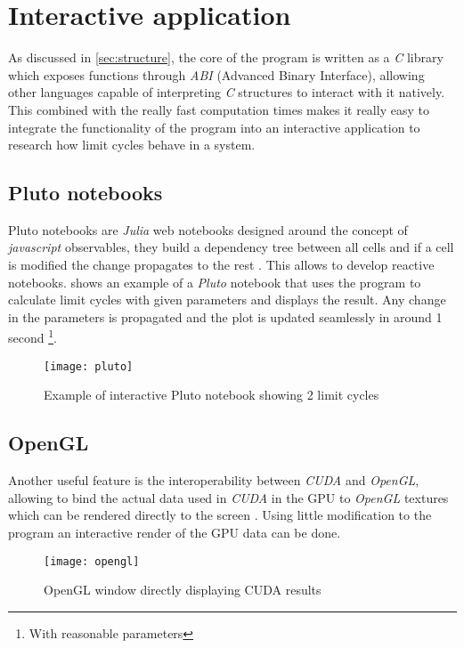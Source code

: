 
\section{Interactive application}%
\label{sec:abi}

As discussed in \cref{sec:structure}, the core of the program is written as a
\emph{C} library which exposes functions through \emph{ABI} (Advanced Binary Interface),
allowing other languages capable of interpreting \emph{C} structures to interact with it
natively. This combined with the really fast computation times makes it really easy to
integrate the functionality of the program into an interactive application to research
how limit cycles behave in a system.
%
\subsection{Pluto notebooks}

Pluto notebooks are \emph{Julia} web notebooks designed around the concept of
\emph{javascript} observables, they build a dependency tree between all cells and
if a cell is modified the change propagates to the rest \cite{plas_fonspplutojl_2021}.
This allows to develop
reactive notebooks.  shows an example of a \emph{Pluto} notebook
that uses the program to calculate limit cycles with given parameters and
displays the result. Any change in the parameters is propagated and the plot is
updated seamlessly in around 1 second \footnote{With reasonable parameters}.

\begin{figure}[H]
    \centering
    \texttt{[image: pluto]}
    \caption{Example of interactive Pluto notebook showing 2 limit cycles}%
    \label{fig:pluto}
\end{figure}

\subsection{OpenGL}

Another useful feature is the interoperability between \emph{CUDA} and
\emph{OpenGL}, allowing to bind the actual data used in \emph{CUDA} in the GPU
to \emph{OpenGL} textures which can be rendered directly to the screen
\cite{noauthor_opengl_nodate}. Using little modification to the program
an interactive render of the GPU data can be done.

\begin{figure}[H]
    \centering
    \texttt{[image: opengl]}
    \caption{OpenGL window directly displaying CUDA results}%
    \label{fig:opengl}
\end{figure}

